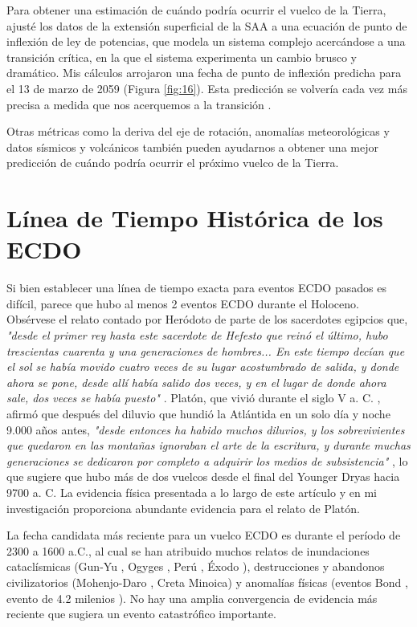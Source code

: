 \documentclass[10pt,twocolumn,letterpaper]{article}
\begin{document}
Para obtener una estimación de cuándo podría ocurrir el vuelco de la Tierra, ajusté los datos de la extensión superficial de la SAA a una ecuación de punto de inflexión de ley de potencias, que modela un sistema complejo acercándose a una transición crítica, en la que el sistema experimenta un cambio brusco y dramático. Mis cálculos arrojaron una fecha de punto de inflexión predicha para el 13 de marzo de 2059 (Figura \ref{fig:16}). Esta predicción se volvería cada vez más precisa a medida que nos acerquemos a la transición \cite{136}.

Otras métricas como la deriva del eje de rotación, anomalías meteorológicas y datos sísmicos y volcánicos también pueden ayudarnos a obtener una mejor predicción de cuándo podría ocurrir el próximo vuelco de la Tierra.

\section{Línea de Tiempo Histórica de los ECDO}

Si bien establecer una línea de tiempo exacta para eventos ECDO pasados es difícil, parece que hubo al menos 2 eventos ECDO durante el Holoceno. Obsérvese el relato contado por Heródoto de parte de los sacerdotes egipcios que, \textit{"desde el primer rey hasta este sacerdote de Hefesto que reinó el último, hubo trescientas cuarenta y una generaciones de hombres... En este tiempo decían que el sol se había movido cuatro veces de su lugar acostumbrado de salida, y donde ahora se pone, desde allí había salido dos veces, y en el lugar de donde ahora sale, dos veces se había puesto"} \cite{32}. Platón, que vivió durante el siglo V a. C. \cite{111}, afirmó que después del diluvio que hundió la Atlántida en un solo día y noche 9.000 años antes, \textit{"desde entonces ha habido muchos diluvios, y los sobrevivientes que quedaron en las montañas ignoraban el arte de la escritura, y durante muchas generaciones se dedicaron por completo a adquirir los medios de subsistencia"} \cite{112}, lo que sugiere que hubo más de dos vuelcos desde el final del Younger Dryas hacia 9700 a. C. La evidencia física presentada a lo largo de este artículo y en mi investigación \cite{2} proporciona abundante evidencia para el relato de Platón.

La fecha candidata más reciente para un vuelco ECDO es durante el período de 2300 a 1600 a.C., al cual se han atribuido muchos relatos de inundaciones cataclísmicas (Gun-Yu \cite{113,114,115}, Ogyges \cite{116,117}, Perú \cite{118,119}, Éxodo \cite{120}), destrucciones y abandonos civilizatorios (Mohenjo-Daro \cite{121}, Creta Minoica\cite{100,101}) y anomalías físicas (eventos Bond \cite{122}, evento de 4.2 milenios \cite{90}). No hay una amplia convergencia de evidencia más reciente que sugiera un evento catastrófico importante.
\end{document}
